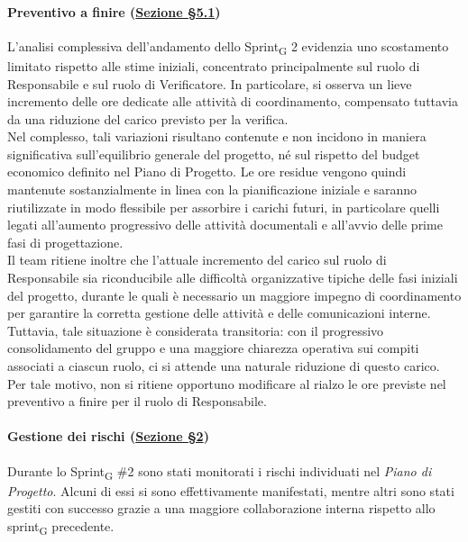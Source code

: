 ﻿\documentclass[a4paper, 10pt, colorlinks=true, linkcolor=black, urlcolor=blue, citecolor=blue, hidelinks]{article}
\begin{document}
\paragraph{Preventivo a finire (\hyperref[tab:preventivo-finire]{Sezione \S5.1})}
L’analisi complessiva dell’andamento dello Sprint\textsubscript{G} 2 evidenzia uno scostamento limitato rispetto alle stime iniziali, concentrato principalmente sul ruolo di Responsabile e sul ruolo di Verificatore. In particolare, si osserva un lieve incremento delle ore dedicate alle attività di coordinamento, compensato tuttavia da una riduzione del carico previsto per la verifica.\\
Nel complesso, tali variazioni risultano contenute e non incidono in maniera significativa sull’equilibrio generale del progetto, né sul rispetto del budget economico definito nel Piano di Progetto. Le ore residue vengono quindi mantenute sostanzialmente in linea con la pianificazione iniziale e saranno riutilizzate in modo flessibile per assorbire i carichi futuri, in particolare quelli legati all’aumento progressivo delle attività documentali e all’avvio delle prime fasi di progettazione.\\
Il team ritiene inoltre che l’attuale incremento del carico sul ruolo di Responsabile sia riconducibile alle difficoltà organizzative tipiche delle fasi iniziali del progetto, durante le quali è necessario un maggiore impegno di coordinamento per garantire la corretta gestione delle attività e delle comunicazioni interne. Tuttavia, tale situazione è considerata transitoria: con il progressivo consolidamento del gruppo e una maggiore chiarezza operativa sui compiti associati a ciascun ruolo, ci si attende una naturale riduzione di questo carico. Per tale motivo, non si ritiene opportuno modificare al rialzo le ore previste nel preventivo a finire per il ruolo di Responsabile.

\paragraph{Gestione dei rischi (\hyperref[tab:gestione-rischi]{Sezione \S2})}
Durante lo Sprint\textsubscript{G} \#2 sono stati monitorati i rischi individuati nel \textit{Piano di Progetto}. Alcuni di essi si sono effettivamente manifestati, mentre altri sono stati gestiti con successo grazie a una maggiore collaborazione interna rispetto allo sprint\textsubscript{G} precedente.
\end{document}
